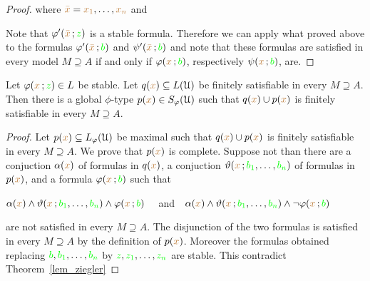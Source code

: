 \begin{proof}

  where ${\color{brown}\bar x}={\color{brown} x_1},\dots,{\color{brown} x_n}$ and 



  Note that $\varphi'({\color{brown}\bar x}\,;{\color{green} z})$ is a stable formula.
  Therefore we can apply what proved above to the formulas $\varphi'({\color{brown}\bar x}\,;{\color{green} b})$ and $\psi'({\color{brown}\bar x}\,;{\color{green} b})$ and note that these formulas are satisfied in every model $M\supseteq A$ if and only if $\varphi({\color{brown} x}\,;{\color{green} b})$, respectively $\psi({\color{brown} x}\,;{\color{green} b})$, are.
\end{proof}

\begin{corollary}\label{corol_stable_coheir_over_models}
  Let $\varphi({\color{brown} x}\,;{\color{green} z})\in L$ be stable.
  Let $q({\color{brown} x})\subseteq L(\EuScript U)$ be finitely satisfiable in every $M\supseteq A$.
  Then there is a global $\phi$-type $p({\color{brown} x})\in S_{\varphi}(\EuScript U)$ such that $q({\color{brown} x})\cup p({\color{brown} x})$ is finitely satisfiable in every $M\supseteq A$.
\end{corollary}

\begin{proof}
  Let $p({\color{brown} x})\subseteq L_\varphi(\EuScript U)$ be maximal such that $q({\color{brown} x})\cup p({\color{brown} x})$ is finitely satisfiable in every $M\supseteq A$.
  We prove that $p({\color{brown} x})$ is complete.
  Suppose not than there are a conjuction $\alpha({\color{brown} x})$ of formulas in $q({\color{brown} x})$, a conjuction $\vartheta({\color{brown} x}\,;{\color{green} b_1},\dots,{\color{green} b_n})$ of formulas in $p({\color{brown} x})$, and a formula $\varphi({\color{brown} x}\,;{\color{green} b})$ such that 

  \hfil$\alpha({\color{brown} x})\wedge\vartheta({\color{brown} x}\,;{\color{green} b_1},\dots,{\color{green} b_n})\wedge\varphi({\color{brown} x}\,;{\color{green} b})$ \ \ and\ \   $\alpha({\color{brown} x})\wedge\vartheta({\color{brown} x}\,;{\color{green} b_1},\dots,{\color{green} b_n})\wedge\neg\varphi({\color{brown} x}\,;{\color{green} b})$ 
 
  are not satisfied in every $M\supseteq A$.
  The disjunction of the two formulas is satisfied in every $M\supseteq A$ by the definition of $p({\color{brown} x})$.
  Moreover the formulas obtained replacing ${\color{green} b},{\color{green} b_1},\dots,{\color{green} b_n}$ by ${\color{green} z},{\color{green} z_1},\dots,{\color{green} z_n}$ are stable.
  This contradict Theorem~\ref{lem_ziegler}
\end{proof}

